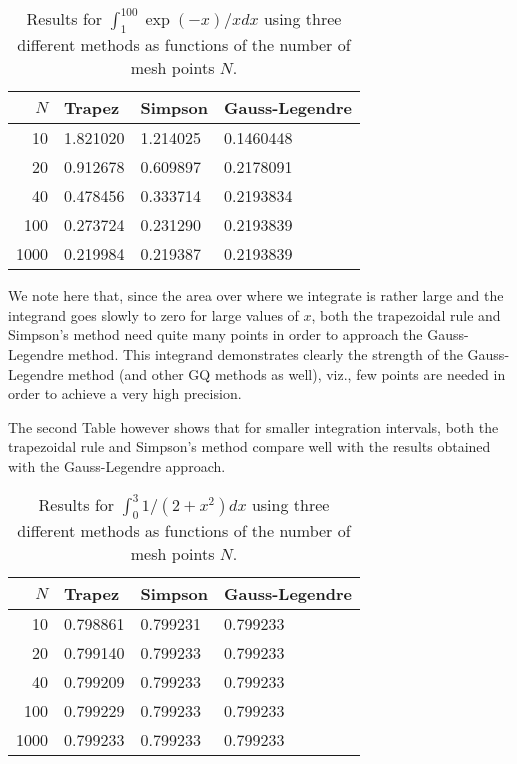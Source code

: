 \begin{table}[hbtp]
\begin{center}
\caption{Results for $\int_1^{100}\exp{(-x)}/xdx$ using three different methods as functions
of the number of mesh points $N$. \label{tab:firstinttable}} 
\begin{tabular}{rlll}\hline
$N$&Trapez&Simpson&Gauss-Legendre\\\hline
10 &  1.821020  &  1.214025  &    0.1460448  \\  
20  &  0.912678  &  0.609897  &    0.2178091  \\
40   & 0.478456  &  0.333714  &  0.2193834   \\
100  & 0.273724   & 0.231290  &  0.2193839 \\
1000 & 0.219984  &  0.219387  &  0.2193839  \\
\hline
\end{tabular} 
\end{center}   
\end{table}     
We note here that, since the area over where we integrate is rather large and the integrand 
goes slowly to zero for large values of $x$, both the trapezoidal rule and Simpson's method
need quite many points in order to approach the Gauss-Legendre method. 
This integrand demonstrates clearly the strength of the Gauss-Legendre method
(and other GQ methods as well), viz., few points
are needed in order to achieve a very high precision.  

The second Table however shows that for smaller integration intervals, both the trapezoidal rule
and Simpson's method compare well with the results obtained with the Gauss-Legendre
approach. 
\begin{table}[hbtp]
\begin{center}
\caption{Results for $\int_{0}^{3}1/(2+x^2)dx$ using three different methods as functions
of the number of mesh points $N$. \label{tab:secondinttable}} 
\begin{tabular}{rlll}\hline
$N$&Trapez&Simpson&Gauss-Legendre\\\hline
10  &  0.798861  &  0.799231  &  0.799233 \\  
20   & 0.799140  &  0.799233  &  0.799233 \\
40  &  0.799209   & 0.799233  &  0.799233 \\
100  & 0.799229  &  0.799233   & 0.799233 \\  
1000 & 0.799233  &  0.799233  &  0.799233 \\
\hline
\end{tabular} 
\end{center}   
\end{table}     



